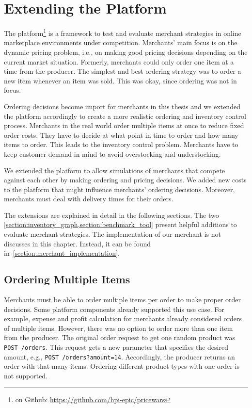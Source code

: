 
\chapter{Extending the \pricewars Platform}
\label{section:platform_extension}

The \pricewars platform\footnote{\pricewars on Github: \url{https://github.com/hpi-epic/pricewars}} is a framework to test and evaluate merchant strategies in online marketplace environments under competition.
Merchants' main focus is on the dynamic pricing problem, i.e., on making good pricing decisions depending on the current market situation.
Formerly, merchants could only order one item at a time from the producer.
The simplest and best ordering strategy was to order a new item whenever an item was sold.
This was okay, since ordering was not in focus.

Ordering decisions become import for merchants in this thesis and we extended the \pricewars platform accordingly to create a more realistic ordering and inventory control process.
Merchants in the real world order multiple items at once to reduce fixed order costs.
They have to decide at what point in time to order and how many items to order.
This leads to the inventory control problem.
Merchants have to keep customer demand in mind to avoid overstocking and understocking.

We extended the \pricewars platform to allow simulations of merchants that compete against each other by making ordering and pricing decisions.
We added new costs to the platform that might influence merchants' ordering decisions.
Moreover, merchants must deal with delivery times for their orders.

The extensions are explained in detail in the following sections.
The two \cref{section:inventory_graph,section:benchmark_tool} present helpful additions to evaluate merchant strategies.
The implementation of our merchant is not discusses in this chapter.
Instead, it can be found in~\cref{section:merchant_implementation}. 

\section{Ordering Multiple Items}
\label{section:multiple_items}
Merchants must be able to order multiple items per order to make proper order decisions.
Some platform components already supported this use case.
For example, expense and profit calculation for merchants already considered orders of multiple items.
However, there was no option to order more than one item from the producer.
The original order request to get one random product was \texttt{POST /orders}.
This request gets a new parameter that specifies the desired amount, e.g., \texttt{POST /orders?amount=14}.
Accordingly, the producer returns an order with that many items.
Ordering different product types with one order is not supported.

